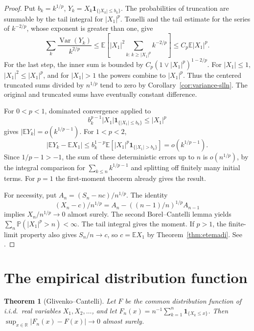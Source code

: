 \documentclass[11pt,oneside,openany]{book}
\newcommand{\Prob}{\mathbb{P}}
\newcommand{\E}{\mathbb{E}}
\newcommand{\R}{\mathbb{R}}
\DeclareMathOperator{\Var}{Var}
\newcommand{\ind}{\mathbf{1}}
\theoremstyle{plain}
\newtheorem{theorem}{Theorem}[chapter]
\theoremstyle{definition}
\theoremstyle{remark}
\begin{document}
\begin{proof}
Put \(b_k=k^{1/p}\), \(Y_k=X_k\ind_{\{|X_k|\le b_k\}}\).
The probabilities of truncation are summable by the tail integral
for \(|X_1|^p\). Tonelli and the tail estimate for the series of
\(k^{-2/p}\), whose exponent is greater than one, give
\[
 \sum_k\frac{\Var(Y_k)}{k^{2/p}}
 \le \E\!\left[|X_1|^2\sum_{k:\,k\ge |X_1|^p} k^{-2/p}\right]
 \le C_p\E |X_1|^p .
\]
For the last step, the inner sum is bounded by
\(C_p(1\vee |X_1|^p)^{1-2/p}\). For \(|X_1|\le1\),
\(|X_1|^2\le |X_1|^p\), and for \(|X_1|>1\) the powers combine
to \(|X_1|^p\). Thus the centered truncated sums divided by
\(n^{1/p}\) tend to zero by Corollary~\ref{cor:variance-slln}.
The original and truncated sums have eventually constant difference.

For \(0<p<1\), dominated convergence applied to
\[
 b_k^{p-1}|X_1|\ind_{\{|X_1|\le b_k\}}
 \le |X_1|^p
\]
gives \(|\E Y_k|=o(k^{1/p-1})\).
For \(1<p<2\),
\[
 |\E Y_k-\E X_1|
 \le b_k^{1-p}\E[|X_1|^p\ind_{\{|X_1|>b_k\}}]
 =o(k^{1/p-1}).
\]
Since \(1/p-1>-1\), the sum of these deterministic errors up to
\(n\) is \(o(n^{1/p})\), by the integral comparison for
\(\sum_{k\le n}k^{1/p-1}\) and splitting off finitely many initial
terms. For \(p=1\) the first-moment theorem already gives the result.

For necessity, put \(A_n=(S_n-nc)/n^{1/p}\).
The identity
\[
 (X_n-c)/n^{1/p}=A_n-((n-1)/n)^{1/p}A_{n-1}
\]
implies \(X_n/n^{1/p}\to0\) almost surely. The second Borel--Cantelli
lemma yields \(\sum_n\Prob(|X_1|^p>n)<\infty\).
The tail integral gives the moment. If \(p>1\), the finite-limit
property also gives \(S_n/n\to c\), so \(c=\E X_1\) by
Theorem~\ref{thm:etemadi}. See \cite[Theorem 5.23]{Kallenberg}.
\end{proof}

\section{The empirical distribution function}
\label{p08-07}

\begin{theorem}[Glivenko--Cantelli]\label{thm:gc}
Let \(F\) be the common distribution function of i.i.d.\ real
variables \(X_1,X_2,\ldots\), and let
\(F_n(x)=n^{-1}\sum_{k=1}^n\ind_{\{X_k\le x\}}\).
Then \(\sup_{x\in\R}|F_n(x)-F(x)|\to0\) almost surely.
\end{theorem}
\end{document}
